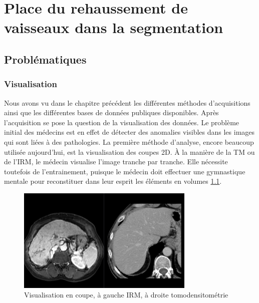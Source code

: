 %
\chapter{Place du rehaussement de vaisseaux dans la segmentation}



\section{Problématiques}
    \subsection{Visualisation}

    Nous avons vu dans le chapitre précédent les différentes méthodes d'acquisitions ainsi que les différentes bases de données publiques disponibles. Après l'acquisition se pose la question de la visualisation des données. Le problème initial des médecins est en effet de détecter des anomalies visibles dans les images qui sont liées à des pathologies. La première méthode d'analyse, encore beaucoup utilisée aujourd'hui, est la visualisation des coupes 2D. À la manière de la TM ou de l'IRM, le médecin visualise l'image tranche par tranche. Elle nécessite toutefois de l'entrainement, puisque le médecin doit effectuer une gymnastique mentale pour reconstituer dans leur esprit les éléments en volumes \ref{fig:slice_visualization}. 

    \begin{figure}[t!]
      \centering
      \includegraphics[height=5cm]{Images/2D_view.png}
      \caption{Visualisation en coupe, à gauche IRM, à droite tomodensitométrie}
      \label{fig:slice_visualization}
    \end{figure}

